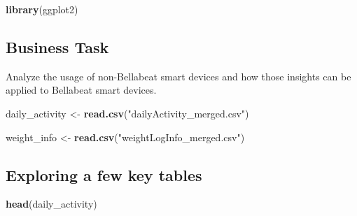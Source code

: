 \documentclass[
]{article}
\newenvironment{Shaded}{\begin{snugshade}}{\end{snugshade}}
\newcommand{\FunctionTok}[1]{\textcolor[rgb]{0.13,0.29,0.53}{\textbf{#1}}}
\newcommand{\NormalTok}[1]{#1}
\newcommand{\OtherTok}[1]{\textcolor[rgb]{0.56,0.35,0.01}{#1}}
\newcommand{\StringTok}[1]{\textcolor[rgb]{0.31,0.60,0.02}{#1}}
\begin{document}
\begin{Shaded}
\begin{Highlighting}[]
\FunctionTok{library}\NormalTok{(ggplot2)}
\end{Highlighting}
\end{Shaded}

\hypertarget{business-task}{%
\subsection{Business Task}\label{business-task}}

Analyze the usage of non-Bellabeat smart devices and how those insights
can be applied to Bellabeat smart devices.

\begin{Shaded}
\begin{Highlighting}[]
\NormalTok{daily\_activity }\OtherTok{\textless{}{-}} \FunctionTok{read.csv}\NormalTok{(}\StringTok{"dailyActivity\_merged.csv"}\NormalTok{)}

\NormalTok{weight\_info }\OtherTok{\textless{}{-}} \FunctionTok{read.csv}\NormalTok{(}\StringTok{"weightLogInfo\_merged.csv"}\NormalTok{)}
\end{Highlighting}
\end{Shaded}

\hypertarget{exploring-a-few-key-tables}{%
\subsection{Exploring a few key
tables}\label{exploring-a-few-key-tables}}

\begin{Shaded}
\begin{Highlighting}[]
\FunctionTok{head}\NormalTok{(daily\_activity)}
\end{Highlighting}
\end{Shaded}
\end{document}
